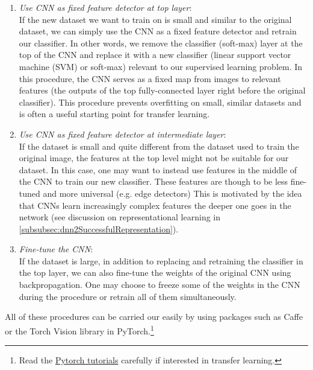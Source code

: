 \begin{enumerate}
	\item \emph{Use CNN as fixed feature detector at top layer}:\\
	If the new dataset we want to train on is small and similar to the original dataset, we can simply use the CNN as a fixed feature detector and retrain our classifier. In other words, we remove the classifier (soft-max) layer at the top of the CNN and replace it with a new classifier (linear support vector machine (SVM) or soft-max) relevant to our supervised learning problem. In this procedure, the CNN serves as a fixed map from images to relevant features (the outputs of the top fully-connected layer right before the original classifier). This procedure prevents overfitting on small, similar datasets and is often a useful starting point for transfer learning.
	\item \emph{Use CNN as fixed feature detector at intermediate layer}:\\
	If the dataset is small and quite different from the dataset used to train the original image, the features at the top level might not be suitable for our dataset. In this case, one may want to instead use features in the middle of the CNN to train our new classifier. These features are though to be less fine-tuned and more universal (e.g. edge detectors) This is motivated by the idea that CNNs learn increasingly complex features the deeper one goes in the network (see discussion on representational learning in \ref{subsubsec:dnn2SuccessfulRepresentation}).
	
	\item \emph{Fine-tune the CNN}:\\
	If the dataset is large, in addition to replacing and retraining the classifier in the top layer, we can also fine-tune the weights of the original CNN using backpropagation. One may choose to freeze some of the weights in the CNN during the procedure or retrain all of them simultaneously.
	
\end{enumerate}
All of these procedures can be carried our easily by using packages such as Caffe or the Torch Vision library in PyTorch.\footnote{Read the \href{https://pytorch.org/tutorials/}{Pytorch tutorials} carefully if interested in transfer learning.}












